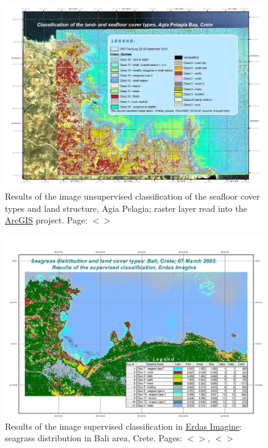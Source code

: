 \documentclass[11pt]{article}
\begin{document}
\begin{appendices}
\begin{figure}[H]
\begin{center}
	\end{center}	
\end{figure}
\begin{figure}[H]
	\begin{center}
		\includegraphics[scale=0.25]{Fig-39.jpg}
		\caption{Results of the image unsupervised classification of the seafloor cover types and land structure, Agia Pelagia; raster layer read into the \href{http://www.esri.com/software/arcgis/index.html}{ArcGIS} project. Page: $<$\pageref{page-48}$>$}
		\label{fig:42}
	\end{center}
\end{figure}
\begin{figure}[H]
	\begin{center}
		\includegraphics[scale=0.25]{Fig-36.jpg}
		\caption{Results of the image supervised classification in \href{http://www.erdas.com/products/ERDASIMAGINE/ERDASIMAGINE/Details.aspx}{Erdas Imagine}: \\ seagrass distribution in Bali area, Crete. Pages: $<$\pageref{page-48}$>$, $<$\pageref{page-liii}$>$}
		\label{fig:39}
	\end{center}
\end{figure}
\pagebreak


\end{appendices}
\end{document}
